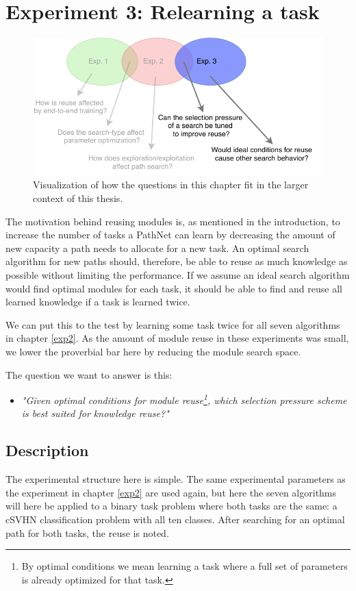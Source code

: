 \chapter{Experiment 3: Relearning a task}
\label{exp3}

\begin{figure}[hb]
    \includegraphics[width=\textwidth]{Chapters/4.Experiments/exp3/figures/exp3.pdf}
    \caption[Experiment focus]{Visualization of how the questions in this chapter fit in the larger context of this thesis.}
    \label{fig:exp3.questions}
\end{figure}

The motivation behind reusing modules is, as mentioned in the introduction, to increase the number of tasks a PathNet can learn by decreasing the amount of new capacity a path needs to allocate for a new task. An optimal search algorithm for new paths should, therefore, be able to reuse as much knowledge as possible without limiting the performance. If we assume an ideal search algorithm would find optimal modules for each task, it should be able to find and reuse all learned knowledge if a task is learned twice. 

We can put this to the test by learning some task twice for all seven algorithms in chapter \ref{exp2}. As the amount of module reuse in these experiments was small, we lower the proverbial bar here by reducing the module search space.

The question we want to answer is this: 
\begin{itemize}
    \item \emph{"Given optimal conditions for module reuse\footnote{By optimal conditions we mean learning a task where a full set of parameters is already optimized for that task.}, which selection pressure scheme is best suited for knowledge reuse?"}
\end{itemize}


\section{Description}
The experimental structure here is simple. The same experimental parameters as the experiment in chapter \ref{exp2} are used again, but here the seven algorithms will here be applied to a binary task problem where both tasks are the same: a cSVHN classification problem with all ten classes. After searching for an optimal path for both tasks, the reuse is noted. 

